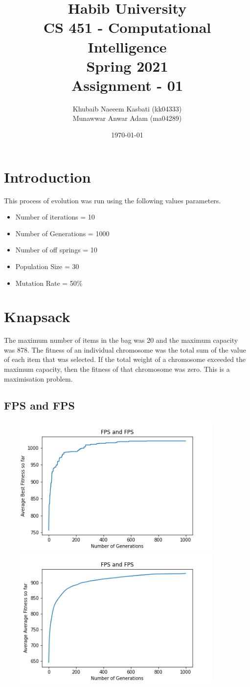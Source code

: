 \documentclass[a4paper]{article}
\title{Habib University \\ CS 451  - Computational Intelligence\\ Spring 2021  \\Assignment  - 01}
\author{Khubaib Naeeem Kasbati (kk04333) \\Munawwar Anwar Adam (ma04289)}
\date{\today}
\begin{document}
\setlength{\parskip}{10pt}
\setlength{\parindent}{0pt}
\maketitle

\section{Introduction}
This process of evolution was run using the following values parameters.
\begin{itemize}
\item Number of iterations = 10
\item Number of Generations = 1000
\item Number of off springs = 10
\item Population Size = 30
\item Mutation Rate = 50\%
\end{itemize}
\section{Knapsack}
The maximum number of items in the bag was 20 and the maximum capacity was 878. The fitness of an individual chromosome was the total sum of the value of each item that was selected. 
If the total weight of a chromosome exceeded the maximum capacity, then the fitness of that chromosome was zero. This is a maximisation problem.

\subsection{FPS and FPS}
\includegraphics[width=12cm, height=7cm]{Graphs/KnapSack/fps_fps_bsf.png} \\
\includegraphics[width=12cm, height=7cm]{Graphs/KnapSack/fps_fps_avg.png} \\
\end{document}

